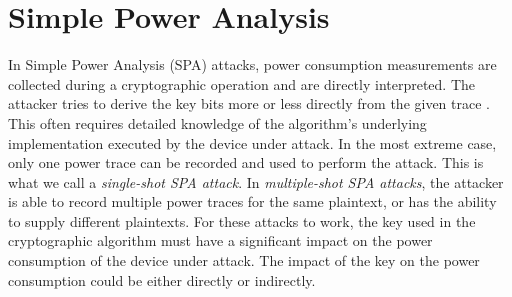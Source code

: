 \section{Simple Power Analysis}
In Simple Power Analysis (SPA) attacks, power consumption measurements are collected during a cryptographic operation and are directly interpreted.
The attacker tries to derive the key bits more or less directly from the given trace \cite{mangard2008power}. 
This often requires detailed knowledge of the algorithm's underlying implementation executed by the device under attack. 
In the most extreme case, only one power trace can be recorded and used to perform the attack.
This is what we call a \emph{single-shot SPA attack}.
In \emph{multiple-shot SPA attacks}, the attacker is able to record multiple power traces for the same plaintext, or has the ability to supply different plaintexts.
For these attacks to work, the key used in the cryptographic algorithm must have a significant impact on the power consumption of the device under attack.
The impact of the key on the power consumption could be either directly or indirectly.

